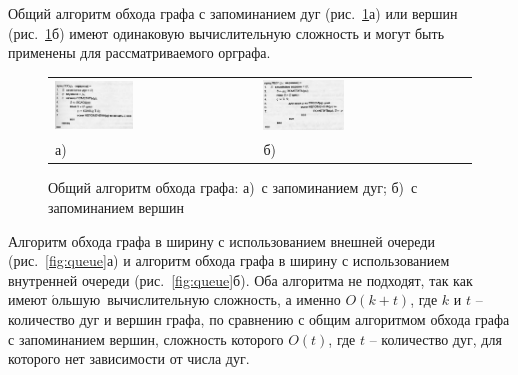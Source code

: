 Общий алгоритм обхода графа с запоминанием дуг (рис.~\ref{fig:save}а) или вершин (рис.~\ref{fig:save}б) имеют одинаковую вычислительную сложность и могут быть применены для рассматриваемого орграфа.

\begin{figure}[h!]
    \centering
\begin{tabular}{P{0.5\textwidth}P{0.5\textwidth}}
  \includegraphics[width=0.4\textwidth]{ResearchNotes/rndhpc_int_edt_2023_01_10/save_arc.png} &
  \includegraphics[width=0.4\textwidth]{ResearchNotes/rndhpc_int_edt_2023_01_10/save_eages.png} \\
    а) & б) \\
\end{tabular}
    \caption{Общий алгоритм обхода графа: а)~с запоминанием дуг; б)~с запоминанием вершин}\label{fig:save}
\end{figure}

Алгоритм обхода графа в ширину с использованием внешней очереди (рис.~\ref{fig:queue}а) и алгоритм обхода графа в ширину с использованием внутренней очереди (рис.~\ref{fig:queue}б). Оба алгоритма не подходят, так как имеют $\acute{\mbox{о}}$льшую\frqq\ вычислительную сложность, а именно $O(k + t)$, где $k$ и $t$ -- количество дуг и вершин графа, по сравнению с общим алгоритмом обхода графа с запоминанием вершин, сложность которого $O(t)$, где $t$ -- количество дуг, для которого нет зависимости от числа дуг.

